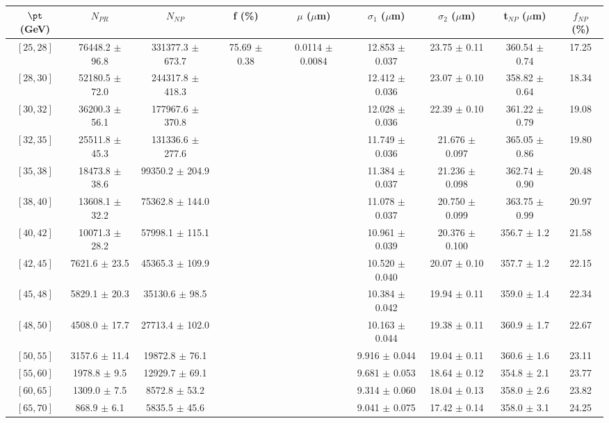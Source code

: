 \begin{tabular}{c||c|c|c|c|c|c|c||c}
$\pt$ (GeV) & $N_{PR}$ & $N_{NP}$ & f (\%) & $\mu$ ($\mu$m) & $\sigma_1$ ($\mu$m) & $\sigma_2$ ($\mu$m)  & t$_{NP}$ ($\mu$m) & $f_{NP}$ (\%) \\
\hline
$[25, 28]$ & 76448.2 $\pm$ 96.8 & 331377.3 $\pm$ 673.7 & \multirow{19}{*}{75.69 $\pm$ 0.38} & \multirow{19}{*}{0.0114 $\pm$ 0.0084} & 12.853 $\pm$ 0.037 & 23.75 $\pm$ 0.11 & 360.54 $\pm$ 0.74 & 17.25\\
$[28, 30]$ & 52180.5 $\pm$ 72.0 & 244317.8 $\pm$ 418.3 &  &  & 12.412 $\pm$ 0.036 & 23.07 $\pm$ 0.10 & 358.82 $\pm$ 0.64 & 18.34\\
$[30, 32]$ & 36200.3 $\pm$ 56.1 & 177967.6 $\pm$ 370.8 &  &  & 12.028 $\pm$ 0.036 & 22.39 $\pm$ 0.10 & 361.22 $\pm$ 0.79 & 19.08\\
$[32, 35]$ & 25511.8 $\pm$ 45.3 & 131336.6 $\pm$ 277.6 &  &  & 11.749 $\pm$ 0.036 & 21.676 $\pm$ 0.097 & 365.05 $\pm$ 0.86 & 19.80\\
$[35, 38]$ & 18473.8 $\pm$ 38.6 & 99350.2 $\pm$ 204.9 &  &  & 11.384 $\pm$ 0.037 & 21.236 $\pm$ 0.098 & 362.74 $\pm$ 0.90 & 20.48\\
$[38, 40]$ & 13608.1 $\pm$ 32.2 & 75362.8 $\pm$ 144.0 &  &  & 11.078 $\pm$ 0.037 & 20.750 $\pm$ 0.099 & 363.75 $\pm$ 0.99 & 20.97\\
$[40, 42]$ & 10071.3 $\pm$ 28.2 & 57998.1 $\pm$ 115.1 &  &  & 10.961 $\pm$ 0.039 & 20.376 $\pm$ 0.100 & 356.7 $\pm$ 1.2 & 21.58\\
$[42, 45]$ & 7621.6 $\pm$ 23.5 & 45365.3 $\pm$ 109.9 &  &  & 10.520 $\pm$ 0.040 & 20.07 $\pm$ 0.10 & 357.7 $\pm$ 1.2 & 22.15\\
$[45, 48]$ & 5829.1 $\pm$ 20.3 & 35130.6 $\pm$ 98.5 &  &  & 10.384 $\pm$ 0.042 & 19.94 $\pm$ 0.11 & 359.0 $\pm$ 1.4 & 22.34\\
$[48, 50]$ & 4508.0 $\pm$ 17.7 & 27713.4 $\pm$ 102.0 &  &  & 10.163 $\pm$ 0.044 & 19.38 $\pm$ 0.11 & 360.9 $\pm$ 1.7 & 22.67\\
$[50, 55]$ & 3157.6 $\pm$ 11.4 & 19872.8 $\pm$ 76.1 &  &  & 9.916 $\pm$ 0.044 & 19.04 $\pm$ 0.11 & 360.6 $\pm$ 1.6 & 23.11\\
$[55, 60]$ & 1978.8 $\pm$ 9.5 & 12929.7 $\pm$ 69.1 &  &  & 9.681 $\pm$ 0.053 & 18.64 $\pm$ 0.12 & 354.8 $\pm$ 2.1 & 23.77\\
$[60, 65]$ & 1309.0 $\pm$ 7.5 & 8572.8 $\pm$ 53.2 &  &  & 9.314 $\pm$ 0.060 & 18.04 $\pm$ 0.13 & 358.0 $\pm$ 2.6 & 23.82\\
$[65, 70]$ & 868.9 $\pm$ 6.1 & 5835.5 $\pm$ 45.6 &  &  & 9.041 $\pm$ 0.075 & 17.42 $\pm$ 0.14 & 358.0 $\pm$ 3.1 & 24.25\\

\end{tabular}
